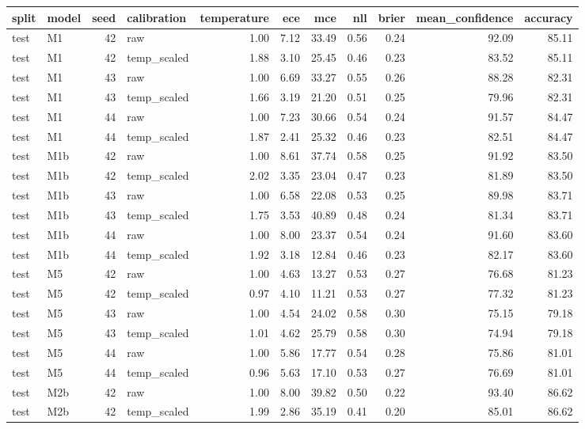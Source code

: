 \begin{tabular}{llrlrrrrrrr}
\toprule
split & model & seed & calibration & temperature & ece & mce & nll & brier & mean\_confidence & accuracy \\
\midrule
test & M1 & 42 & raw & 1.00 & 7.12 & 33.49 & 0.56 & 0.24 & 92.09 & 85.11 \\
test & M1 & 42 & temp\_scaled & 1.88 & 3.10 & 25.45 & 0.46 & 0.23 & 83.52 & 85.11 \\
test & M1 & 43 & raw & 1.00 & 6.69 & 33.27 & 0.55 & 0.26 & 88.28 & 82.31 \\
test & M1 & 43 & temp\_scaled & 1.66 & 3.19 & 21.20 & 0.51 & 0.25 & 79.96 & 82.31 \\
test & M1 & 44 & raw & 1.00 & 7.23 & 30.66 & 0.54 & 0.24 & 91.57 & 84.47 \\
test & M1 & 44 & temp\_scaled & 1.87 & 2.41 & 25.32 & 0.46 & 0.23 & 82.51 & 84.47 \\
test & M1b & 42 & raw & 1.00 & 8.61 & 37.74 & 0.58 & 0.25 & 91.92 & 83.50 \\
test & M1b & 42 & temp\_scaled & 2.02 & 3.35 & 23.04 & 0.47 & 0.23 & 81.89 & 83.50 \\
test & M1b & 43 & raw & 1.00 & 6.58 & 22.08 & 0.53 & 0.25 & 89.98 & 83.71 \\
test & M1b & 43 & temp\_scaled & 1.75 & 3.53 & 40.89 & 0.48 & 0.24 & 81.34 & 83.71 \\
test & M1b & 44 & raw & 1.00 & 8.00 & 23.37 & 0.54 & 0.24 & 91.60 & 83.60 \\
test & M1b & 44 & temp\_scaled & 1.92 & 3.18 & 12.84 & 0.46 & 0.23 & 82.17 & 83.60 \\
test & M5 & 42 & raw & 1.00 & 4.63 & 13.27 & 0.53 & 0.27 & 76.68 & 81.23 \\
test & M5 & 42 & temp\_scaled & 0.97 & 4.10 & 11.21 & 0.53 & 0.27 & 77.32 & 81.23 \\
test & M5 & 43 & raw & 1.00 & 4.54 & 24.02 & 0.58 & 0.30 & 75.15 & 79.18 \\
test & M5 & 43 & temp\_scaled & 1.01 & 4.62 & 25.79 & 0.58 & 0.30 & 74.94 & 79.18 \\
test & M5 & 44 & raw & 1.00 & 5.86 & 17.77 & 0.54 & 0.28 & 75.86 & 81.01 \\
test & M5 & 44 & temp\_scaled & 0.96 & 5.63 & 17.10 & 0.53 & 0.27 & 76.69 & 81.01 \\
test & M2b & 42 & raw & 1.00 & 8.00 & 39.82 & 0.50 & 0.22 & 93.40 & 86.62 \\
test & M2b & 42 & temp\_scaled & 1.99 & 2.86 & 35.19 & 0.41 & 0.20 & 85.01 & 86.62 \\

\end{tabular}
